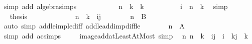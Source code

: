 \begin{isabellebody}
\ {\isacharparenleft}{\kern0pt}simp\ add{\isacharcolon}{\kern0pt}\ algebra{\isacharunderscore}{\kern0pt}simps{\isacharparenright}{\kern0pt}\isanewline
\ \ \ \ \ \ \isamarkupfalse%
\ \isamarkupfalse%
\ {\isachardoublequoteopen}{\isasymdots}\ {\isacharequal}{\kern0pt}\ n\ {\isacharminus}{\kern0pt}\ k\ {\isacharplus}{\kern0pt}\ k{\isachardoublequoteclose}\isanewline
\ \ \ \ \ \ \ \ \isamarkupfalse%
\ {\isacartoucheopen}i\ {\isasymle}\ n\ {\isacharminus}{\kern0pt}\ k{\isacartoucheclose}\ \isamarkupfalse%
\ simp\isanewline
\ \ \ \ \ \ \isamarkupfalse%
\ \isamarkupfalse%
\ {\isacharquery}{\kern0pt}thesis\ \isacommand{{\isachardot}{\kern0pt}}\isamarkupfalse%
\isanewline
\ \ \ \ \isamarkupfalse%
\isanewline
\ \ \ \ \isamarkupfalse%
\ \isamarkupfalse%
\ {\isachardoublequoteopen}n\ {\isacharminus}{\kern0pt}\ k\ {\isasymin}\ {\isacharbraceleft}{\kern0pt}i{\isachardot}{\kern0pt}{\isachardot}{\kern0pt}j{\isacharbraceright}{\kern0pt}{\isachardoublequoteclose}\isanewline
\ \ \ \ \ \ \isamarkupfalse%
\ {\isacartoucheopen}n\ {\isasymin}\ {\isacharquery}{\kern0pt}B{\isacartoucheclose}\isanewline
\ \ \ \ \ \ \isamarkupfalse%
\ {\isacharparenleft}{\kern0pt}auto\ simp{\isacharcolon}{\kern0pt}\ add{\isacharunderscore}{\kern0pt}le{\isacharunderscore}{\kern0pt}imp{\isacharunderscore}{\kern0pt}le{\isacharunderscore}{\kern0pt}diff\ add{\isacharunderscore}{\kern0pt}le{\isacharunderscore}{\kern0pt}add{\isacharunderscore}{\kern0pt}imp{\isacharunderscore}{\kern0pt}diff{\isacharunderscore}{\kern0pt}le{\isacharparenright}{\kern0pt}\isanewline
\ \ \ \ \isamarkupfalse%
\ \isamarkupfalse%
\ {\isachardoublequoteopen}n\ {\isasymin}\ {\isacharquery}{\kern0pt}A{\isachardoublequoteclose}\isanewline
\ \ \ \ \ \ \isamarkupfalse%
\ {\isacharparenleft}{\kern0pt}simp\ add{\isacharcolon}{\kern0pt}\ ac{\isacharunderscore}{\kern0pt}simps{\isacharparenright}{\kern0pt}\ \isanewline
\ \ \isamarkupfalse%
\isanewline
{}\isamarkupfalse%
%
\endisatagproof
{\isafoldproof}%
%
\isadelimproof
\isanewline
%
\endisadelimproof
\isanewline
{}\isamarkupfalse%
\ image{\isacharunderscore}{\kern0pt}add{\isacharunderscore}{\kern0pt}atLeastAtMost{\isacharprime}{\kern0pt}\ {\isacharbrackleft}{\kern0pt}simp{\isacharbrackright}{\kern0pt}{\isacharcolon}{\kern0pt}\isanewline
\ \ {\isachardoublequoteopen}{\isacharparenleft}{\kern0pt}{\isasymlambda}n{\isachardot}{\kern0pt}\ n\ {\isacharplus}{\kern0pt}\ k{\isacharparenright}{\kern0pt}\ {\isacharbackquote}{\kern0pt}\ {\isacharbraceleft}{\kern0pt}i{\isachardot}{\kern0pt}{\isachardot}{\kern0pt}j{\isacharbraceright}{\kern0pt}\ {\isacharequal}{\kern0pt}\ {\isacharbraceleft}{\kern0pt}i\ {\isacharplus}{\kern0pt}\ k{\isachardot}{\kern0pt}{\isachardot}{\kern0pt}j\ {\isacharplus}{\kern0pt}\ k{\isacharbraceright}{\kern0pt}{\isachardoublequoteclose}\isanewline

\end{isabellebody}
